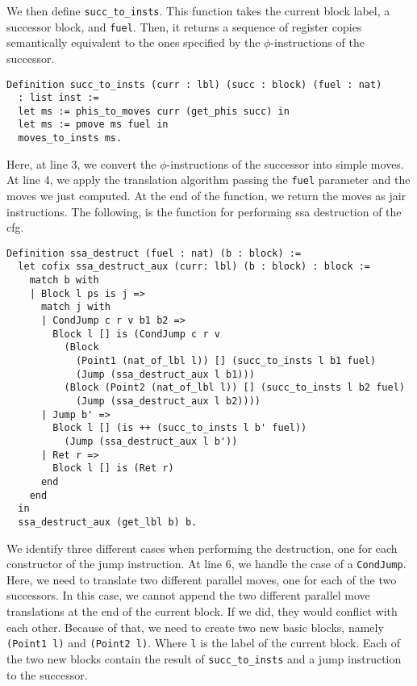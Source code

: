 We then define \texttt{succ\_to\_insts}. This function takes the current block label, a successor block, and \texttt{fuel}. Then, it returns a sequence of register copies semantically equivalent to the ones specified by the $\phi$-instructions of the successor.

\begin{lstlisting}[style=Rocq]
Definition succ_to_insts (curr : lbl) (succ : block) (fuel : nat)
  : list inst :=
  let ms := phis_to_moves curr (get_phis succ) in
  let ms := pmove ms fuel in
  moves_to_insts ms.
\end{lstlisting}

Here, at line 3, we convert the $\phi$-instructions of the successor into simple moves. At line 4, we apply the translation algorithm passing the \texttt{fuel} parameter and the moves we just computed. At the end of the function, we return the moves as \gls{jair} instructions.
The following, is the function for performing \gls{ssa} destruction of the \gls{cfg}.

\begin{lstlisting}[style=Rocq]
Definition ssa_destruct (fuel : nat) (b : block) :=
  let cofix ssa_destruct_aux (curr: lbl) (b : block) : block :=
    match b with
    | Block l ps is j =>
      match j with
      | CondJump c r v b1 b2 =>
        Block l [] is (CondJump c r v
          (Block
            (Point1 (nat_of_lbl l)) [] (succ_to_insts l b1 fuel)
            (Jump (ssa_destruct_aux l b1)))
          (Block (Point2 (nat_of_lbl l)) [] (succ_to_insts l b2 fuel)
            (Jump (ssa_destruct_aux l b2))))
      | Jump b' =>
        Block l [] (is ++ (succ_to_insts l b' fuel))
          (Jump (ssa_destruct_aux l b'))
      | Ret r =>
        Block l [] is (Ret r)
      end
    end
  in
  ssa_destruct_aux (get_lbl b) b.
\end{lstlisting}

We identify three different cases when performing the destruction, one for each constructor of the jump instruction. At line 6, we handle the case of a \texttt{CondJump}. Here, we need to translate two different parallel moves, one for each of the two successors. In this case, we cannot append the two different parallel move translations at the end of the current block. If we did, they would conflict with each other. Because of that, we need to create two new basic blocks, namely \texttt{(Point1 l)} and \texttt{(Point2 l)}. Where \texttt l is the label of the current block. Each of the two new blocks contain the result of \texttt{succ\_to\_insts} and a jump instruction to the successor.

